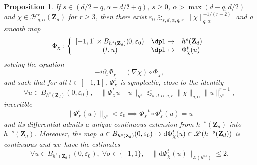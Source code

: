 \documentclass[JEP,XML,SOM,Unicode,NoEqCountersInSection,published]{cedram}
\newcommand\mto{\mathchoice{\longmapsto}{\mapsto}{\mapsto}{\mapsto}}
\newtheorem{proposition}[theorem]{Proposition}
\theoremstyle{definition}
\begin{document}
\begin{proposition}
\label{prop_ham_flow} If $s\in (d/2-q, \alpha-d/2+q)$, $s\geq 0$, $\alpha >\max(d-q,d/2)$ and $\chi \in \mathscr{H}_{q,\alpha}^r(\mathbf{Z}_d)$ for $r\geq 3$, then there exist $ \varepsilon_0 \gtrsim_{s,d,\alpha,q,r} \|\chi \|_{q,\alpha}^{-1/(r-2)}$ and a smooth map
\[
\Phi_\chi: \left\{ \begin{array}{cll} [-1,1] \times B_{h^s(\mathbf{Z}_d)}(0,\varepsilon_0) &\dpl\to& h^s(\mathbf{Z}_d) \\ (t,u) &\dpl\mto& \Phi_\chi^t(u) \end{array} \right.
\]
solving the equation
\[
-i\partial_t \Phi_\chi = (\nabla \chi)\circ \Phi_\chi,
\]
and such that for all $t\in [-1,1]$, $\Phi_\chi^t$ is symplectic, close to the identity
\begin{equation}
\label{eq_dindon}
\forall u \in B_{h^s(\mathbf{Z}_d)}(0,\varepsilon_0), \quad \| \Phi_\chi^t u - u \|_{h^s} \lesssim_{s,d,\alpha,q,r} \|\chi \|_{q,\alpha} \| u \|_{h^s}^{r-1},
\end{equation}
invertible
\begin{equation}
\label{eq_invertibility}
\|\Phi_\chi^{t} (u) \|_{h^s} < \varepsilon_0 \implies \Phi_\chi^{-t}\circ \Phi_\chi^{t} (u) = u
\end{equation}
and its differential admits a unique continuous extension from $h^{-s}(\mathbf{Z}_d)$ into $h^{-s}(\mathbf{Z}_d)$. Moreover, the map $u\in B_{h^s(\mathbf{Z}_d)}(0,\varepsilon_0) \mto \mathrm{d} \Phi_\chi^t(u) \in \mathscr{L}(h^{-s}(\mathbf{Z}_d))$ is continuous and we~have the estimates
\begin{equation}
\label{eq_petanque}
\forall u \in B_{h^s(\mathbf{Z}_d)}(0,\varepsilon_0),\;\forall \sigma\in \{-1,1\},\quad \| \mathrm{d} \Phi_\chi^t (u)\|_{\mathscr{L}(h^{\sigma s})}\leq 2.
\end{equation}
\end{proposition}
\end{document}
